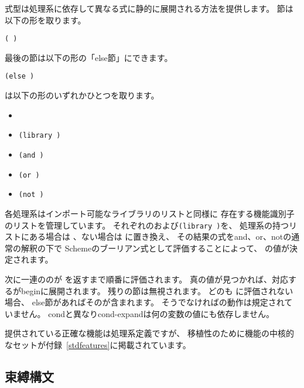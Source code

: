 \begin{entry}{%
}

\syntax
{}式型は処理系に依存して異なる式に静的に展開される方法を提供します。
節は以下の形を取ります。

{\tt(  \dotsfoo)}

最後の節は以下の形の「else節」にできます。

{\tt(else  \dotsfoo)}

は以下の形のいずれかひとつを取ります。

\begin{itemize}
\item {\tt{}}
\item {\tt(library )}
\item {\tt(and  \dotsfoo)}
\item {\tt(or  \dotsfoo)}
\item {\tt(not )}
\end{itemize}

\semantics
各処理系はインポート可能なライブラリのリストと同様に
存在する機能識別子のリストを管理しています。
それぞれのおよび{\tt(library )}を、
処理系の持つリストにある場合は \schtrue{}、ない場合は \schfalse{}に置き換え、
その結果の式を{\cf and}、{\cf or}、{\cf not}の通常の解釈の下で
Schemeのブーリアン式として評価することによって、
の値が決定されます。

次に一連ののが %
\schtrue{}を返すまで順番に評価されます。
真の値が見つかれば、対応するが{\cf begin}に展開されます。
残りの節は無視されます。
どのも \schtrue{}に評価されない場合、
else節があればそのが含まれます。
そうでなければの動作は規定されていません。
{\cf cond}と異なり{\cf cond-expand}は何の変数の値にも依存しません。

提供されている正確な機能は処理系定義ですが、
移植性のために機能の中核的なセットが付録~\ref{stdfeatures}に掲載されています。

\end{entry}

\subsection{束縛構文}
\label{bindingsection}

